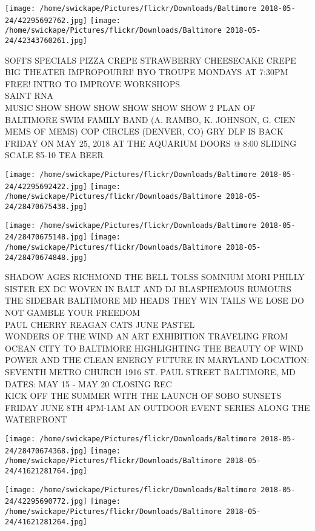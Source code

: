 \documentclass[10pt,letterpaper]{article}
\begin{document}
\texttt{[image: /home/swickape/Pictures/flickr/Downloads/Baltimore 2018-05-24/42295692762.jpg]}
\texttt{[image: /home/swickape/Pictures/flickr/Downloads/Baltimore 2018-05-24/42343760261.jpg]}

SOFI'S SPECIALS PIZZA CREPE STRAWBERRY CHEESECAKE CREPE\\
BIG THEATER IMPROPOURRI! BYO TROUPE MONDAYS AT 7:30PM FREE! INTRO TO IMPROVE WORKSHOPS\\
SAINT RNA\\
MUSIC SHOW SHOW SHOW SHOW SHOW SHOW 2 PLAN OF BALTIMORE SWIM FAMILY BAND (A. RAMBO, K. JOHNSON, G. CIEN MEMS OF MEMS) COP CIRCLES (DENVER, CO) GRY DLF IS BACK FRIDAY ON MAY 25, 2018 AT THE AQUARIUM DOORS @ 8:00 SLIDING SCALE \$5{-}10 TEA BEER
\pagebreak

\texttt{[image: /home/swickape/Pictures/flickr/Downloads/Baltimore 2018-05-24/42295692422.jpg]}
\texttt{[image: /home/swickape/Pictures/flickr/Downloads/Baltimore 2018-05-24/28470675438.jpg]}

\texttt{[image: /home/swickape/Pictures/flickr/Downloads/Baltimore 2018-05-24/28470675148.jpg]}
\texttt{[image: /home/swickape/Pictures/flickr/Downloads/Baltimore 2018-05-24/28470674848.jpg]}

SHADOW AGES RICHMOND THE BELL TOLSS SOMNIUM MORI PHILLY SISTER EX DC WOVEN IN BALT AND DJ BLASPHEMOUS RUMOURS THE SIDEBAR BALTIMORE MD HEADS THEY WIN TAILS WE LOSE DO NOT GAMBLE YOUR FREEDOM\\
PAUL CHERRY REAGAN CATS JUNE PASTEL\\
WONDERS OF THE WIND AN ART EXHIBITION TRAVELING FROM OCEAN CITY TO BALTIMORE HIGHLIGHTING THE BEAUTY OF WIND POWER AND THE CLEAN ENERGY FUTURE IN MARYLAND LOCATION: SEVENTH METRO CHURCH 1916 ST. PAUL STREET BALTIMORE, MD DATES: MAY 15 {-} MAY 20 CLOSING REC\\
KICK OFF THE SUMMER WITH THE LAUNCH OF SOBO SUNSETS FRIDAY JUNE 8TH 4PM{-}1AM AN OUTDOOR EVENT SERIES ALONG THE WATERFRONT
\pagebreak

\texttt{[image: /home/swickape/Pictures/flickr/Downloads/Baltimore 2018-05-24/28470674368.jpg]}
\texttt{[image: /home/swickape/Pictures/flickr/Downloads/Baltimore 2018-05-24/41621281764.jpg]}

\texttt{[image: /home/swickape/Pictures/flickr/Downloads/Baltimore 2018-05-24/42295690772.jpg]}
\texttt{[image: /home/swickape/Pictures/flickr/Downloads/Baltimore 2018-05-24/41621281264.jpg]}
\end{document}
